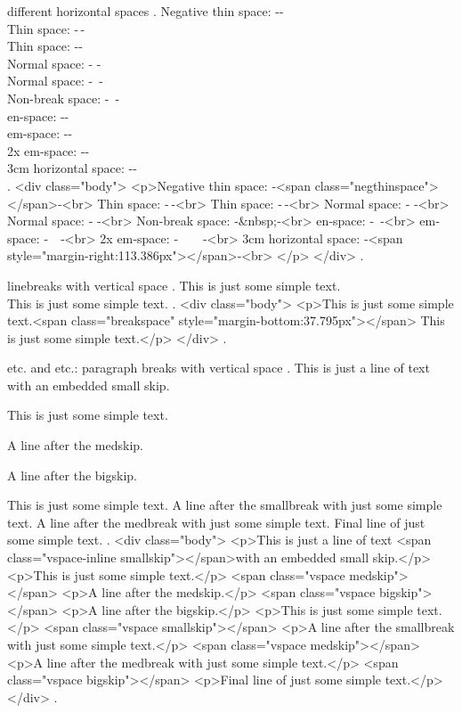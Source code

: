 different horizontal spaces
.
Negative thin space: -\negthinspace- \\
Thin space: -\,- \\
Thin space: -\thinspace- \\
Normal space: - - \\
Normal space: -\ - \\
Non-break space: -~- \\
en-space: -\enspace- \\
em-space: -\quad- \\
2x em-space: -\qquad-\\
3cm horizontal space: -\hspace{3cm}- \\
.
<div class="body">
<p>Negative thin space: ‐<span class="negthinspace"></span>‐<br>
Thin space: ‐ ‐<br>
Thin space: ‐ ‐<br>
Normal space: ‐ ‐<br>
Normal space: ‐​ ‐<br>
Non‐break space: ‐&nbsp;‐<br>
en‐space: ‐ ‐<br>
em‐space: ‐ ‐<br>
2x em‐space: ‐  ‐<br>
3cm horizontal space: ‐<span style="margin-right:113.386px"></span>‐<br>
</p>
</div>
.


linebreaks with vertical space
.
This is just some simple text.\\[1cm]
This is just some simple text.
.
<div class="body">
<p>This is just some simple text.<span class="breakspace" style="margin-bottom:37.795px"></span>
This is just some simple text.</p>
</div>
.


\smallskip etc. and \smallbreak etc.: paragraph breaks with vertical space
.
This is just a line of text \smallskip with an embedded small skip.

This is just some simple text.

\medskip
A line after the medskip.

\bigskip

A line after the bigskip.

This is just some simple text.
\smallbreak
A line after the smallbreak with just some simple text.
\medbreak
A line after the medbreak with just some simple text.
\bigbreak
Final line of just some simple text.
.
<div class="body">
<p>This is just a line of text <span class="vspace-inline smallskip"></span>with an embedded small skip.</p>
<p>This is just some simple text.</p>
<span class="vspace medskip"></span>
<p>A line after the medskip.</p>
<span class="vspace bigskip"></span>
<p>A line after the bigskip.</p>
<p>This is just some simple text.</p>
<span class="vspace smallskip"></span>
<p>A line after the smallbreak with just some simple text.</p>
<span class="vspace medskip"></span>
<p>A line after the medbreak with just some simple text.</p>
<span class="vspace bigskip"></span>
<p>Final line of just some simple text.</p>
</div>
.


